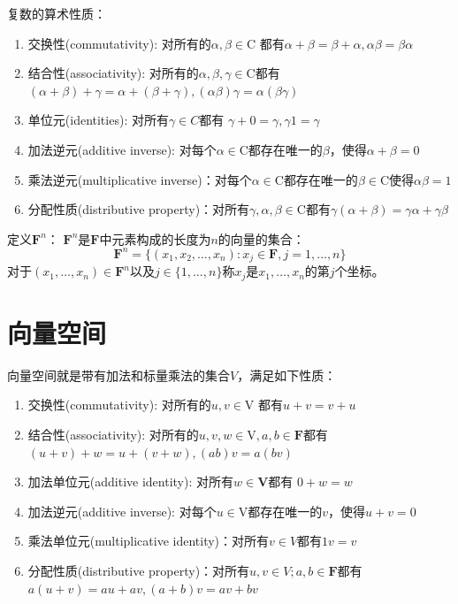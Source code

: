 \documentclass[10pt,a4paper,UTF8]{article}
\begin{document}
复数的算术性质：
\begin{enumerate}
\item 交换性(commutativity): 对所有的\(\alpha ,\beta \in \mathrm{C}\) 都有\(\alpha + \beta= \beta + \alpha,\alpha\beta = \beta\alpha\)
\item 结合性(associativity): 对所有的\(\alpha,\beta,\gamma \in \mathrm{C}\)都有 \((\alpha + \beta) + \gamma = \alpha + (\beta + \gamma), (\alpha\beta)\gamma = \alpha(\beta\gamma)\)
\item 单位元(identities): 对所有\(\gamma \in C\)都有 \(\gamma + 0 = \gamma,\gamma 1 =\gamma\)
\item 加法逆元(additive inverse): 对每个\(\alpha\in \mathrm{C}\)都存在唯一的\(\beta\)，使得\(\alpha + \beta = 0\)
\item 乘法逆元(multiplicative inverse)：对每个\(\alpha \in \mathrm{C}\)都存在唯一的\(\beta \in \mathrm{C}\)使得\(\alpha\beta = 1\)
\item 分配性质(distributive property)：对所有\(\gamma,\alpha,\beta\in \mathrm{C}\)都有\(\gamma(\alpha+\beta) = \gamma\alpha + \gamma\beta\)
\end{enumerate}

\begin{definition}
定义\(\mathbf{F}^{n}\)： \(\mathbf{F}^{n}\)是\(\mathbf{F}\)中元素构成的长度为\(n\)的向量的集合：\[\mathbf{F}^{n} = \{(x_{1},x_{2},\ldots,x_{n}):x_{j}\in \mathbf{F},j=1,\ldots,n\}\]对于\((x_{1},\ldots,x_{n})\in \mathbf{F}^{n}\)以及\(j\in\{1,\ldots,n\}\)称\(x_{j}\)是\(x_{1},\ldots,x_{n}\)的第\(j\)个坐标。
\end{definition}

\section{向量空间}
\label{sec:orgheadline2}


向量空间就是带有加法和标量乘法的集合\(V\)，满足如下性质：
\begin{enumerate}
\item 交换性(commutativity): 对所有的\(u ,v \in \mathrm{V}\) 都有\(u + v= v + u\)
\item 结合性(associativity): 对所有的\(u,v,w \in \mathrm{V},a,b\in \mathbf{F}\)都有 \((u + v) + w = u + (v + w), (ab)v = a(bv)\)
\item 加法单位元(additive identity): 对所有\(w \in \mathbf{V}\)都有 \(0 + w =w\)
\item 加法逆元(additive inverse): 对每个\(u\in \mathrm{V}\)都存在唯一的\(v\)，使得\(u + v = 0\)
\item 乘法单位元(multiplicative identity)：对所有\(v\in V\)都有\(1v = v\)
\item 分配性质(distributive property)：对所有\(u,v\in V; a,b\in \mathbf{F}\)都有\(a(u+v) = au + av, (a+b)v = av + bv\)
\end{enumerate}
\end{document}

